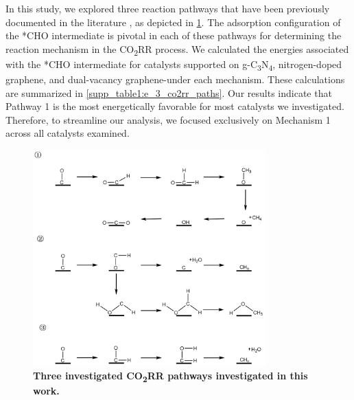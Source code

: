 In this study, we explored three reaction pathways that have been previously documented in the literature \cite{durand2011structure, nie2014reaction, peterson2010copper}, as depicted in \cref{supp_fig8:co2rr_paths}.
The adsorption configuration of the *CHO intermediate is pivotal in each of these pathways for determining the reaction mechanism in the CO\textsubscript{2}RR process.
We calculated the energies associated with the *CHO intermediate for catalysts
supported on g-C\textsubscript{3}N\textsubscript{4}, nitrogen-doped graphene, and dual-vacancy graphene-under each mechanism.
These calculations are summarized in \cref{supp_table1:e_3_co2rr_paths}.
Our results indicate that Pathway 1 is the most energetically favorable for most catalysts we investigated.
Therefore, to streamline our analysis, we focused exclusively on Mechanism 1 across all catalysts examined.

\begin{figure}[htbp]
  \centering
  \includegraphics[width=0.8\textwidth]{supp_fig8_co2rr_paths.png}
  \caption{\textbf{Three investigated CO\textsubscript{2}RR pathways \cite{durand2011structure, nie2014reaction, peterson2010copper} investigated in this work.}}
  \label{supp_fig8:co2rr_paths}
\end{figure}

